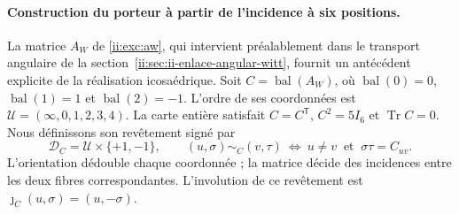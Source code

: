\paragraph{Construction du porteur à partir de l'incidence à six positions.}
\label{ii:ii:ico:construccion-firmada}
La matrice \(A_W\) de \eqref{ii:exc:aw}, qui intervient préalablement dans le
transport angulaire de la section~\ref{ii:sec:ii-enlace-angular-witt}, fournit
un antécédent explicite de la réalisation icosaédrique. Soit
\(C=\operatorname{bal}(A_W)\), où
\(\operatorname{bal}(0)=0\), \(\operatorname{bal}(1)=1\) et
\(\operatorname{bal}(2)=-1\). L'ordre de ses coordonnées est
\(\mathcal U=(\infty,0,1,2,3,4)\). La carte entière satisfait
\(C=C^{\mathsf T}\), \(C^2=5I_6\) et \(\operatorname{Tr}C=0\).
Nous définissons son revêtement signé par
\begin{equation}
 \mathcal D_C=\mathcal U\times\{+1,-1\},\qquad
 (u,\sigma)\sim_C(v,\tau)
 \ \Longleftrightarrow\ u\ne v\ \text{ et }\ \sigma\tau=C_{uv}.
 \label{ii:ii:ico:incidencia-firmada}
\end{equation}
L'orientation dédouble chaque coordonnée ; la matrice décide des incidences
entre les deux fibres correspondantes. L'involution de ce revêtement
est \(\jmath_C(u,\sigma)=(u,-\sigma)\).

